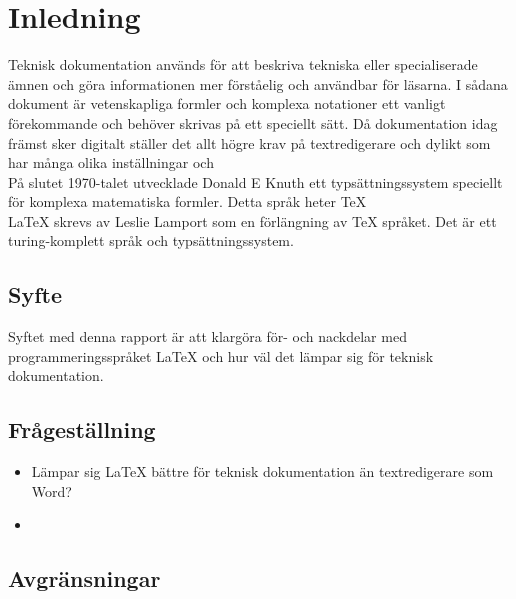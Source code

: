 \section{Inledning}
Teknisk dokumentation används för att beskriva tekniska eller specialiserade ämnen och göra informationen mer förståelig och användbar för läsarna. I sådana dokument är vetenskapliga formler och komplexa notationer ett vanligt förekommande och behöver skrivas på ett speciellt sätt. Då dokumentation idag främst sker digitalt ställer det allt högre krav på textredigerare och dylikt som har många olika inställningar och
\\
På slutet 1970-talet utvecklade Donald E Knuth ett typsättningssystem speciellt för komplexa matematiska formler. Detta språk heter {\TeX}
\\
{\LaTeX} skrevs av Leslie Lamport som en förlängning av {\TeX} språket. Det är ett turing-komplett språk och typsättningssystem.  


\subsection{Syfte}
Syftet med denna rapport är att klargöra för- och nackdelar med programmeringsspråket {\LaTeX} och hur väl det lämpar sig för teknisk dokumentation.  

\subsection{Frågeställning}
\begin{itemize} 
\item Lämpar sig {\LaTeX} bättre för teknisk dokumentation än textredigerare som Word?
\item  
\end{itemize}
		
\subsection{Avgränsningar}


	